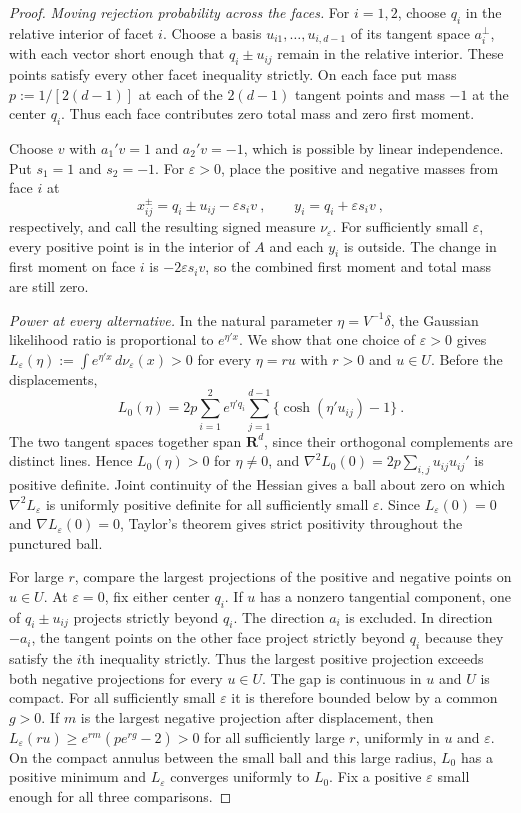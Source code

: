 \documentclass[11pt]{article}
\numberwithin{equation}{section}
\theoremstyle{definition}
\begin{document}
{{\begin{proof}
\emph{Moving rejection probability across the faces.}
For $i=1,2$, choose $q_i$ in the relative interior of facet $i$. Choose a basis $u_{i1},\ldots,u_{i,d-1}$ of its tangent space $a_i^\perp$, with each vector short enough that $q_i\pm u_{ij}$ remain in the relative interior. These points satisfy every other facet inequality strictly. On each face put mass $p:=1/[2(d-1)]$ at each of the $2(d-1)$ tangent points and mass $-1$ at the center $q_i$. Thus each face contributes zero total mass and zero first moment.

Choose $v$ with $a_1'v=1$ and $a_2'v=-1$, which is possible by linear independence. Put $s_1=1$ and $s_2=-1$. For $\varepsilon>0$, place the positive and negative masses from face $i$ at
\[
 x_{ij}^{\pm}=q_i\pm u_{ij}-\varepsilon s_iv~,
 \qquad y_i=q_i+\varepsilon s_iv~,
\]
respectively, and call the resulting signed measure $\nu_\varepsilon$. For sufficiently small $\varepsilon$, every positive point is in the interior of $A$ and each $y_i$ is outside. The change in first moment on face $i$ is $-2\varepsilon s_i v$, so the combined first moment and total mass are still zero.

\emph{Power at every alternative.}
In the natural parameter $\eta=V^{-1}\delta$, the Gaussian likelihood ratio is proportional to $e^{\eta'x}$. We show that one choice of $\varepsilon>0$ gives $L_\varepsilon(\eta):=\int e^{\eta'x}\,d\nu_\varepsilon(x)>0$ for every $\eta=ru$ with $r>0$ and $u\in U$. Before the displacements,
\[
 L_0(\eta)=2p\sum_{i=1}^2 e^{\eta'q_i}\sum_{j=1}^{d-1}\{\cosh(\eta'u_{ij})-1\}~.
\]
The two tangent spaces together span $\mathbf R^d$, since their orthogonal complements are distinct lines. Hence $L_0(\eta)>0$ for $\eta\ne0$, and $\nabla^2 L_0(0)=2p\sum_{i,j}u_{ij}u_{ij}'$ is positive definite. Joint continuity of the Hessian gives a ball about zero on which $\nabla^2 L_\varepsilon$ is uniformly positive definite for all sufficiently small $\varepsilon$. Since $L_\varepsilon(0)=0$ and $\nabla L_\varepsilon(0)=0$, Taylor's theorem gives strict positivity throughout the punctured ball.

For large $r$, compare the largest projections of the positive and negative points on $u\in U$. At $\varepsilon=0$, fix either center $q_i$. If $u$ has a nonzero tangential component, one of $q_i\pm u_{ij}$ projects strictly beyond $q_i$. The direction $a_i$ is excluded. In direction $-a_i$, the tangent points on the other face project strictly beyond $q_i$ because they satisfy the $i$th inequality strictly. Thus the largest positive projection exceeds both negative projections for every $u\in U$. The gap is continuous in $u$ and $U$ is compact. For all sufficiently small $\varepsilon$ it is therefore bounded below by a common $g>0$. If $m$ is the largest negative projection after displacement, then $L_\varepsilon(ru)\ge e^{rm}(p e^{rg}-2)>0$ for all sufficiently large $r$, uniformly in $u$ and $\varepsilon$. On the compact annulus between the small ball and this large radius, $L_0$ has a positive minimum and $L_\varepsilon$ converges uniformly to $L_0$. Fix a positive $\varepsilon$ small enough for all three comparisons.


\end{proof}}}
\end{document}
